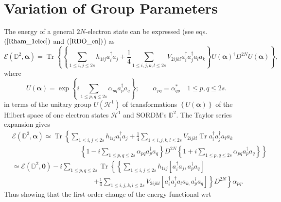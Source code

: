 \documentclass[aps,preprint]{revtex4}%
\begin{document}
\section{Variation of Group Parameters\label{VarGroupPar}}

The energy of a general $2N$-electron state can be expressed (see eqs.
$\left(  \ref{Rham_1elec}\right)  $ and $\left(  \ref{RDO_en}\right)  $) as
\begin{equation}
\mathcal{E}\left(  \mathbb{D}^{2},\mathbf{\alpha}\right)  =\operatorname{Tr}%
\left\{  \left\{  \sum_{1\leq i,j\leq2s}h_{1ij}a_{i}^{\dagger}a_{j}+\frac
{1}{4}\sum_{1\leq i,j,k,l\leq2s}V_{2ijkl}a_{i}^{\dagger}a_{j}^{\dagger}%
a_{l}a_{k}\right\}  U\left(  \mathbf{\alpha}\right)  ^{\dagger}D^{2N}U\left(
\mathbf{\alpha}\right)  \right\}  ,
\end{equation}
where
\begin{equation}
U\left(  \mathbf{\alpha}\right)  =\exp\left\{  i\sum_{1\leq p,q\leq2s}%
\alpha_{pq}a_{p}^{\dagger}a_{q}\right\}  ;\qquad\alpha_{pq}=\alpha_{qp}^{\ast
}\quad1\leq p,q\leq2s.
\end{equation}
in terms of the unitary group $U\left(  \mathcal{H}^{1}\right)  $ of
transformations $\left\{  U\left(  \mathbf{\alpha}\right)  \right\}  $ of the
Hilbert space of one electron states $\mathcal{H}^{1}$ and SORDM's
$\mathbb{D}^{2}$. The Taylor series expansion gives
\begin{align}
&  \mathcal{E}\left(  \mathbb{D}^{2},\mathbf{\alpha}\right)  \simeq
\operatorname{Tr}\left\{  \sum_{1\leq i,j\leq2s}h_{1ij}a_{i}^{\dagger}%
a_{j}+\frac{1}{4}\sum_{1\leq i,j,k,l\leq2s}V_{2ijkl}\operatorname{Tr}%
a_{i}^{\dagger}a_{j}^{\dagger}a_{l}a_{k}\right. \nonumber\\
&  \qquad\qquad\qquad\qquad\qquad\left.  \left\{  1-i\sum_{1\leq p,q\leq
2s}\alpha_{pq}a_{p}^{\dagger}a_{q}\right\}  D^{2N}\left\{  1+i\sum_{1\leq
p,q\leq2s}\alpha_{pq}a_{p}^{\dagger}a_{q}\right\}  \right\} \nonumber\\
&  \simeq\mathcal{E}\left(  \mathbb{D}^{2},\mathbf{0}\right)  -i\sum_{1\leq
p,q\leq2s}\operatorname{Tr}\left\{  \left\{  \sum_{1\leq i,j\leq2s}%
h_{1ij}\left[  a_{i}^{\dagger}a_{j},a_{p}^{\dagger}a_{q}\right]  \right.
\right. \nonumber\\
&  \qquad\qquad\qquad\qquad\qquad\qquad\left.  \left.  +\frac{1}{4}\sum_{1\leq
i,j,k,l\leq2s}V_{2ijkl}\left[  a_{i}^{\dagger}a_{j}^{\dagger}a_{l}a_{k,}%
a_{p}^{\dagger}a_{q}\right]  \right\}  D^{2N}\right\}  \alpha_{pq}.
\end{align}
Thus showing that the first order change of the energy functional wrt
\end{document}

